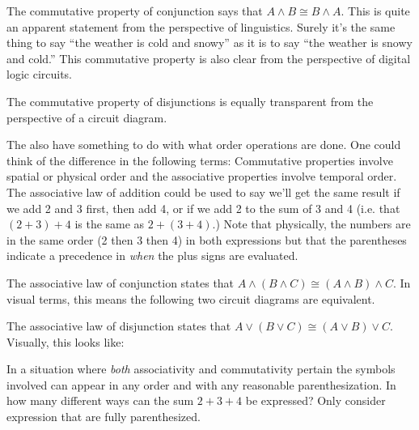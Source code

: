 The commutative property of conjunction says that $A \land B \cong B \land A$.
This is quite an apparent statement from the perspective of linguistics.
Surely it's the same thing to say ``the weather is cold and snowy'' as it is to
say ``the weather is snowy and cold.''   
This commutative property is also clear 
from the perspective of digital logic circuits.

\begin{center}

\end{center}   
  
The commutative property of disjunctions is equally transparent from
the perspective of a circuit diagram.  

\begin{center}

\end{center}   
  
The  also have something to do with what order operations
are done.  One could think of the difference in the following terms:  
Commutative properties
involve spatial or physical order and the associative properties involve
temporal order.  The associative law of addition could be used to say we'll
get the same result if we add 2 and 3 first, then add 4, or if we add 2 to the 
sum of 3 and 4 (i.e. that $(2+3)+4$ is the same as $2+(3+4)$.)  Note that 
physically, the numbers are in the same order (2 then 3 then 4) in both 
expressions but that the parentheses indicate a precedence in {\em when} the
plus signs are evaluated. 

The associative law of conjunction states that $A \land (B \land C) \cong
(A \land B) \land C$.  In visual terms, this means the following two 
circuit diagrams are equivalent.

\begin{center}

\end{center}   
  
The associative law of disjunction states that $A \lor (B \lor C) \cong
(A \lor B) \lor C$.  Visually, this looks like:

\begin{center}

\end{center}   
  

\begin{exer}
In a situation where {\em both} associativity and commutativity pertain
the symbols involved can appear in any order and with any reasonable 
parenthesization.  In how many different ways can the sum $2+3+4$ 
be expressed?  Only consider expression that are fully parenthesized.
\end{exer}
 
